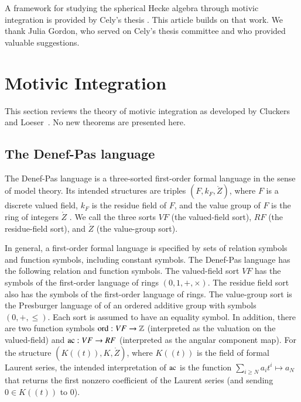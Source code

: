 A framework for studying the spherical Hecke algebra through motivic integration is provided by Cely's thesis \cite{cely}.
This article builds on that work.  We thank Julia Gordon, who served on Cely's thesis committee and who provided valuable suggestions.


\section{Motivic Integration}

This section reviews the theory of motivic integration as developed by Cluckers and
Loeser~\cite{cluckers2008constructible}.  No new theorems are presented here.

\subsection{The Denef-Pas language}

The Denef-Pas language is a three-sorted first-order formal language in the sense of model theory.  
Its intended structures are triples $(F,k_F,\ring{Z})$, 
where $F$ is a discrete valued field, 
$k_F$ is the residue field of $F$, 
and the value group of $F$ is the ring of integers $\ring{Z}$ . 
We call the three sorts $VF$ (the valued-field sort), $RF$ (the residue-field sort), and $\ring{Z}$ (the value-group sort).

In general, a first-order formal language is specified by sets of relation symbols and function symbols, including constant symbols.  
The Denef-Pas language has the following relation and function symbols.  
The valued-field sort $VF$ has the symbols of the first-order language of rings $(0,1,+,\times)$.  
The residue field sort also has the symbols of the first-order language of rings.  
The value-group sort is the Presburger language of of an ordered additive group with symbols $(0,+,\le)$.  
Each sort is assumed to have an equality symbol.  
In addition, there are two function symbols ${\operatorname{ord}}:VF\to\mathbb{Z}$ (interpreted as the valuation on the valued-field) and ${\operatorname{ac}}:VF\to RF$ 
(interpreted as the angular component map).  
For the structure $(K((t)),K,\ring{Z})$, where $K((t))$ is the field of formal Laurent series, 
the intended interpretation of ${\operatorname{ac}}$ 
is the function $\sum_{i\ge N} a_i t^i\mapsto a_N$ 
that returns the first nonzero coefficient of the Laurent series (and sending $0\in K((t))$ to $0$).


